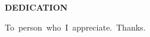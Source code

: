 \pagebreak
\begin{center}{\large\bf DEDICATION\\}\end{center}
\vspace*{1in}
\begin{center}
\mbox{To person who I appreciate. Thanks.}
\end{center}
\pagebreak

